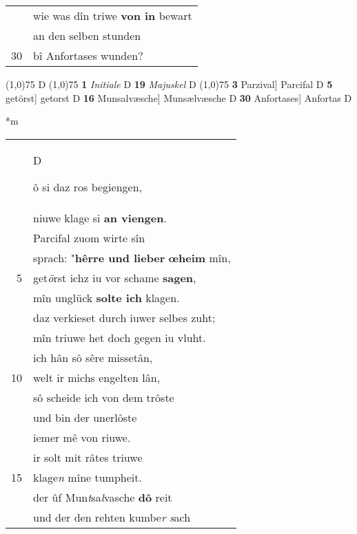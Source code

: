 \documentclass[8pt,a4paper,notitlepage]{article}
\begin{document}
\begin{table}[ht]
\begin{minipage}[t]{0.5\linewidth}
\begin{tabular}{rl}
 & wie was dîn triwe \textbf{von in} bewart\\ 
 & an den selben stunden\\ 
30 & bî Anfortases wunden?\\ 
\end{tabular}
\scriptsize
\line(1,0){75} \newline
D \newline
\line(1,0){75} \newline
\textbf{1} \textit{Initiale} D  \textbf{19} \textit{Majuskel} D  \newline
\line(1,0){75} \newline
\textbf{3} Parzival] Parcifal D \textbf{5} getörst] getorst D \textbf{16} Munsalvæsche] Munsælvæsche D \textbf{30} Anfortases] Anfortas D \newline
\end{minipage}
\hspace{0.5cm}
\begin{minipage}[t]{0.5\linewidth}
\small
\begin{center}*m
\end{center}
\begin{tabular}{rl}
 & \begin{large}D\end{large}ô si daz ros begiengen,\\ 
 & niuwe klage si \textbf{an viengen}.\\ 
 & Parcifal zuom wirte sîn\\ 
 & sprach: "\textbf{hêrre und lieber} \textbf{œheim} mîn,\\ 
5 & get\textit{ö}rst ichz iu vor schame \textbf{sagen},\\ 
 & mîn unglück \textbf{solte ich} klagen.\\ 
 & daz verkieset durch iuwer selbes zuht;\\ 
 & mîn triuwe het doch gegen iu vluht.\\ 
 & ich hân sô sêre missetân,\\ 
10 & welt ir michs engelten lân,\\ 
 & sô scheide ich von dem trôste\\ 
 & und bin der unerlôste\\ 
 & iemer mê von riuwe.\\ 
 & ir solt mit râtes triuwe\\ 
15 & klage\textit{n} mîne tumpheit.\\ 
 & der ûf Mun\textit{t}sa\textit{l}vasche \textbf{dô} reit\\ 
 & und der den rehten kumbe\textit{r} \textit{s}ach\\ 

\end{tabular}
\end{minipage}
\end{table}
\end{document}
